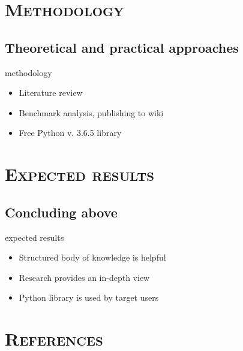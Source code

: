 \documentclass[xcolor=x11names,compress]{beamer}
\renewcommand{\(}{\begin{columns}}
\renewcommand{\)}{\end{columns}}
\newcommand{\<}[1]{\begin{column}{#1}}
\renewcommand{\>}{\end{column}}
\begin{document}
\section{\scshape Methodology}
\subsection{Theoretical and practical approaches}
\begin{frame}{methodology}
    \begin{itemize}
        \item Literature review
        \item Benchmark analysis, publishing to wiki
        \item Free Python v. 3.6.5 library
    \end{itemize}
\end{frame}


\section{\scshape Expected results}
\subsection{Concluding above}
\begin{frame}{expected results}
    \begin{itemize}
        \item Structured body of knowledge is helpful
        \item Research provides an in-depth view
        \item Python library is used by target users
    \end{itemize}
\end{frame}

\section{\scshape References}
\end{document}
